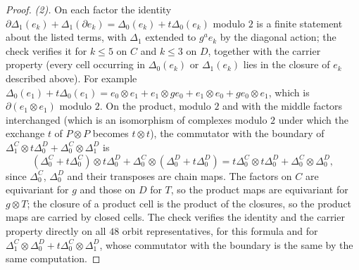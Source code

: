 \begin{proof}
\emph{(2).} On each factor the identity $\partial\Delta_{1}(e_{k}) + \Delta_{1}(\partial e_{k}) = \Delta_{0}(e_{k}) + t\Delta_{0}(e_{k})$ modulo $2$ is a finite statement about the listed terms, with $\Delta_{1}$ extended to $g^{a}e_{k}$ by the diagonal action; the check verifies it for $k \leq 5$ on $C$ and $k \leq 3$ on $D$, together with the carrier property (every cell occurring in $\Delta_{0}(e_{k})$ or $\Delta_{1}(e_{k})$ lies in the closure of $e_{k}$ described above). For example $\Delta_{0}(e_{1}) + t\Delta_{0}(e_{1}) = e_{0} \otimes e_{1} + e_{1} \otimes ge_{0} + e_{1} \otimes e_{0} + ge_{0} \otimes e_{1}$, which is $\partial(e_{1} \otimes e_{1})$ modulo $2$. On the product, modulo $2$ and with the middle factors interchanged (which is an isomorphism of complexes modulo $2$ under which the exchange $t$ of $P \otimes P$ becomes $t \otimes t$), the commutator with the boundary of $\Delta_{1}^{C} \otimes t\Delta_{0}^{D} + \Delta_{0}^{C} \otimes \Delta_{1}^{D}$ is
\[
(\Delta_{0}^{C} + t\Delta_{0}^{C}) \otimes t\Delta_{0}^{D} + \Delta_{0}^{C} \otimes (\Delta_{0}^{D} + t\Delta_{0}^{D}) = t\Delta_{0}^{C} \otimes t\Delta_{0}^{D} + \Delta_{0}^{C} \otimes \Delta_{0}^{D},
\]
since $\Delta_{0}^{C}$, $\Delta_{0}^{D}$ and their transposes are chain maps. The factors on $C$ are equivariant for $g$ and those on $D$ for $T$, so the product maps are equivariant for $g \otimes T$; the closure of a product cell is the product of the closures, so the product maps are carried by closed cells. The check verifies the identity and the carrier property directly on all $48$ orbit representatives, for this formula and for $\Delta_{1}^{C} \otimes \Delta_{0}^{D} + t\Delta_{0}^{C} \otimes \Delta_{1}^{D}$, whose commutator with the boundary is the same by the same computation.


\end{proof}
